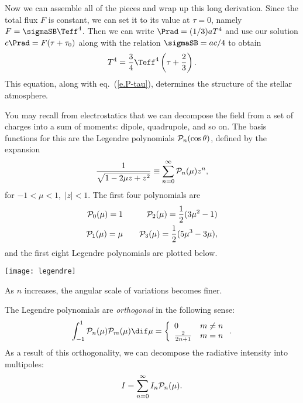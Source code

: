Now we can assemble all of the pieces and wrap up this long derivation. Since the total flux $F$ is constant, we can set it to its value at $\tau=0$, namely $F = \sigmaSB\Teff^{4}$. Then we can write $\Prad = (1/3) a T^{4}$ and use our solution $c\Prad = F(\tau+\tau_{0})$ along with the relation $\sigmaSB = ac/4$ to obtain
\begin{equation}\label{e.T-tau}
T^{4} = \frac{3}{4}\Teff^{4}\left(\tau + \frac{2}{3}\right).
\end{equation}
This equation, along with eq.~(\ref{e.P-tau}), determines the structure of the stellar atmosphere.

\begin{sidebar}
\label{sb.intensity-decomposition}
You may recall from electrostatics that we can decompose the field from a set of charges into a sum of moments: dipole, quadrupole, and so on. The basis functions for this are the Legendre polynomials $\mathcal{P}_{n}(\cos\theta)$, defined by the expansion
\[
	\frac{1}{\sqrt{1 - 2\mu z + z^{2}}} \equiv \sum_{n=0}^{\infty}\mathcal{P}_{n}(\mu)z^{n},
\]
for $-1<\mu<1,\;|z| < 1$. The first four polynomials are
\begin{eqnarray*}
	\mathcal{P}_{0}(\mu) = 1 &\quad& \mathcal{P}_{2}(\mu) = \frac{1}{2}(3\mu^{2}-1)\\
	\mathcal{P}_{1}(\mu) = \mu &\quad& \mathcal{P}_{3}(\mu) = \frac{1}{2}(5\mu^{3}-3\mu),
\end{eqnarray*}
and the first eight Legendre polynomials are plotted below.

\texttt{[image: legendre]}

\noindent As $n$ increases, the angular scale of variations becomes finer.

The Legendre polynomials are \emph{orthogonal} in the following sense:
\begin{equation}\label{e.orthogonal}
\int_{-1}^{1}\Pl{n}(\mu)\Pl{m}(\mu)\dif \mu = \left\{
\begin{array}{lr}
	0 &  m\neq n\\
	\frac{2}{2n+1} & m=n
\end{array}\right..
\end{equation}
As a result of this orthogonality, we can decompose the radiative intensity into multipoles:
\begin{equation}\label{e.decomposition}
	I = \sum_{n=0}^{\infty} I_{n} \mathcal{P}_{n}(\mu).
\end{equation}


\end{sidebar}
